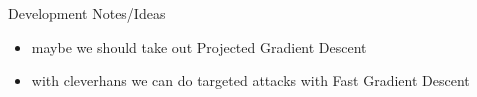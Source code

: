 \documentclass{article}
\begin{document}
    




\tableofcontents
\vspace{1in}
{\Large \noindent Development Notes/Ideas}
\begin{itemize}
    \item maybe we should take out Projected Gradient Descent
    \item with cleverhans we can do targeted attacks with Fast Gradient Descent
\end{itemize}
\pagebreak

\pagebreak

\pagebreak




\pagebreak
\printbibliography
\end{document}
